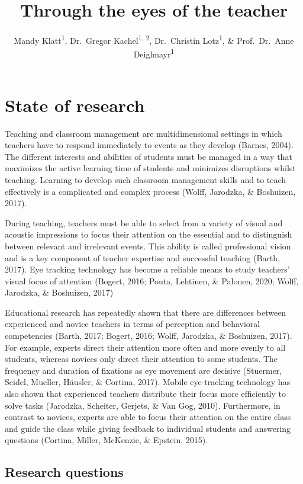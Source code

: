 \documentclass[
  english,
  man,floatsintext]{apa6}
\title{Through the eyes of the teacher}
\author{Mandy Klatt\textsuperscript{1}, Dr.~Gregor Kachel\textsuperscript{1, 2}, Dr.~Christin Lotz\textsuperscript{1}, \& Prof.~Dr.~Anne Deiglmayr\textsuperscript{1}}
\date{}
\affiliation{\vspace{0.5cm}\textsuperscript{1} Leipzig University\\\textsuperscript{2} Max-Planck University for Evolutionary Anthropology}
\begin{document}
\maketitle

\hypertarget{state-of-research}{%
\section{State of research}\label{state-of-research}}

Teaching and classroom management are multidimensional settings in which teachers have to respond immediately to events as they develop (Barnes, 2004). The different interests and abilities of students must be managed in a way that maximizes the active learning time of students and minimizes disruptions whilst teaching. Learning to develop such classroom management skills and to teach effectively is a complicated and complex process (Wolff, Jarodzka, \& Boshuizen, 2017).

During teaching, teachers must be able to select from a variety of visual and acoustic impressions to focus their attention on the essential and to distinguish between relevant and irrelevant events. This ability is called professional vision and is a key component of teacher expertise and successful teaching (Barth, 2017). Eye tracking technology has become a reliable means to study teachers' visual focus of attention (Bogert, 2016; Pouta, Lehtinen, \& Palonen, 2020; Wolff, Jarodzka, \& Boshuizen, 2017)

Educational research has repeatedly shown that there are differences between experienced and novice teachers in terms of perception and behavioral competencies (Barth, 2017; Bogert, 2016; Wolff, Jarodzka, \& Boshuizen, 2017). For example, experts direct their attention more often and more evenly to all students, whereas novices only direct their attention to some students. The frequency and duration of fixations as eye movement are decisive (Stuermer, Seidel, Mueller, Häusler, \& Cortina, 2017). Mobile eye-tracking technology has also shown that experienced teachers distribute their focus more efficiently to solve tasks (Jarodzka, Scheiter, Gerjets, \& Van Gog, 2010). Furthermore, in contrast to novices, experts are able to focus their attention on the entire class and guide the class while giving feedback to individual students and answering questions (Cortina, Miller, McKenzie, \& Epstein, 2015).

\hypertarget{research-questions}{%
\subsection{Research questions}\label{research-questions}}
\end{document}
